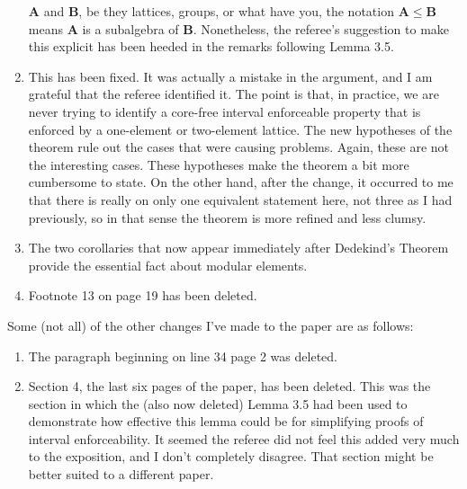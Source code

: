 \documentclass{article}
\newcommand{\bB}{{\mathbf{B}}}
\newcommand{\bA}{\ensuremath{\mathbf{A}}}
\begin{document}
\begin{enumerate}[(1)]
  $\bA$ and $\bB$, be they lattices, groups, or what have you, the notation $\bA
  \leq \bB$ means $\bA$ is a subalgebra of $\bB$. Nonetheless, the referee's
  suggestion to make this explicit has been heeded in the remarks following
  Lemma 3.5. 
\item  This has been fixed.  It was actually a mistake in the argument, and I am
  grateful that the referee identified it.  The point is that, in practice, we
  are never trying to identify a core-free interval enforceable property that is
  enforced by a one-element or two-element lattice.  The new hypotheses of the
  theorem rule out the cases that were causing problems. Again, these are not the
  interesting cases.  These hypotheses make the theorem a bit more cumbersome to
  state.  On the other hand, after the change, it occurred to me that there is
  really on only one equivalent statement here, not three as I had previously, so
  in that sense the theorem is more refined and less clumsy.
\item The two corollaries that now appear immediately after Dedekind's Theorem
  provide the essential fact about modular elements.
\item Footnote 13 on page 19 has been deleted.

\end{enumerate}

\vskip1cm
Some (not all) of the other changes I've made to the paper are as follows:
\begin{enumerate}[(1)]
\item 
The paragraph beginning on line 34 page 2 was deleted.
\item 
Section 4, the last six pages of the paper, has been deleted.  This was the
section in which the (also now deleted) Lemma 3.5 had been used to demonstrate how
effective this lemma could be for simplifying proofs of interval enforceability.
It seemed the referee did not feel this added very much to the exposition, and I
don't completely disagree.  That section might be better suited to a different
paper. 

\end{enumerate}
\end{document}
